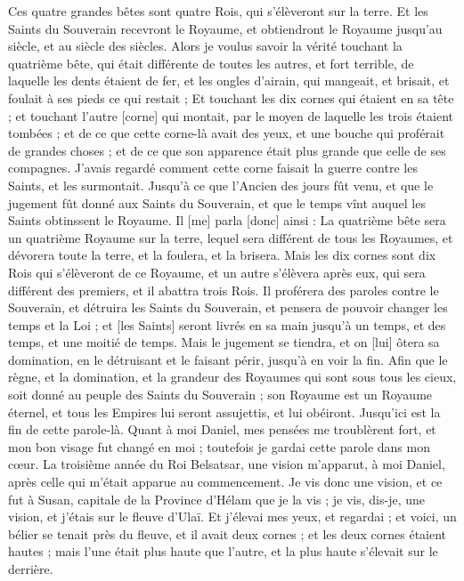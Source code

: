 \begin{multicols}{2}
Ces quatre grandes bêtes sont quatre Rois, qui s'élèveront sur la terre.
Et les Saints du Souverain recevront le Royaume, et obtiendront le Royaume jusqu'au siècle, et au siècle des siècles.
Alors je voulus savoir la vérité touchant la quatrième bête, qui était différente de toutes les autres, et fort terrible, de laquelle les dents étaient de fer, et les ongles d'airain, qui mangeait, et brisait, et foulait à ses pieds ce qui restait ;
Et touchant les dix cornes qui étaient en sa tête ; et touchant l'autre [corne] qui montait, par le moyen de laquelle les trois étaient tombées ; et de ce que cette corne-là avait des yeux, et une bouche qui proférait de grandes choses ; et de ce que son apparence était plus grande que celle de ses compagnes.
J'avais regardé comment cette corne faisait la guerre contre les Saints, et les surmontait.
Jusqu'à ce que l'Ancien des jours fût venu, et que le jugement fût donné aux Saints du Souverain, et que le temps vînt auquel les Saints obtinssent le Royaume.
Il [me] parla [donc] ainsi : La quatrième bête sera un quatrième Royaume sur la terre, lequel sera différent de tous les Royaumes, et dévorera toute la terre, et la foulera, et la brisera.
Mais les dix cornes sont dix Rois qui s'élèveront de ce Royaume, et un autre s'élèvera après eux, qui sera différent des premiers, et il abattra trois Rois.
Il proférera des paroles contre le Souverain, et détruira les Saints du Souverain, et pensera de pouvoir changer les temps et la Loi ; et [les Saints] seront livrés en sa main jusqu'à un temps, et des temps, et une moitié de temps.
Mais le jugement se tiendra, et on [lui] ôtera sa domination, en le détruisant et le faisant périr, jusqu'à en voir la fin.
Afin que le règne, et la domination, et la grandeur des Royaumes qui sont sous tous les cieux, soit donné au peuple des Saints du Souverain ; son Royaume est un Royaume éternel, et tous les Empires lui seront assujettis, et lui obéiront.
Jusqu'ici est la fin de cette parole-là. Quant à moi Daniel, mes pensées me troublèrent fort, et mon bon visage fut changé en moi ; toutefois je gardai cette parole dans mon cœur.
\VerseOne{}La troisième année du Roi Belsatsar, une vision m'apparut, à moi Daniel, après celle qui m'était apparue au commencement.
Je vis donc une vision, et ce fut à Susan, capitale de la Province d'Hélam que je la vis ; je vis, dis-je, une vision, et j'étais sur le fleuve d'Ulaï.
Et j'élevai mes yeux, et regardai ; et voici, un bélier se tenait près du fleuve, et il avait deux cornes ; et les deux cornes étaient hautes ; mais l'une était plus haute que l'autre, et la plus haute s'élevait sur le derrière.

\end{multicols}
